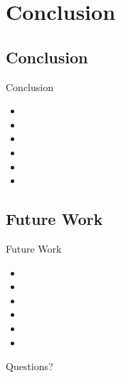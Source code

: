 \documentclass{beamer} %
\begin{document}
%


\section{Conclusion}

\subsection{Conclusion}

\begin{frame}{Conclusion}
\begin{itemize}
\item
\item
\item
\item
\item
\item
\end{itemize}
\end{frame}

\subsection{Future Work}

\begin{frame}{Future Work}
\begin{itemize}
\item
\item
\item
\item
\item
\item
\end{itemize}
\end{frame}


\begin{frame}{Questions?}
\end{frame}
\end{document}
